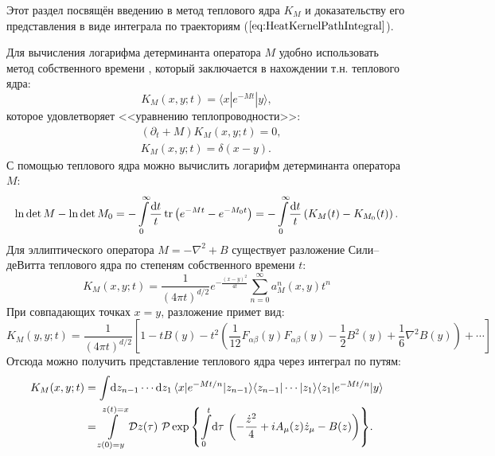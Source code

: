 
Этот раздел посвящён введению в метод теплового ядра $K_M$ и доказательству его представления в виде интеграла по траекториям ($\ref{eq:HeatKernelPathIntegral}$).

Для вычисления логарифма детерминанта оператора $M$ удобно использовать метод собственного времени \cite{Fock}, который заключается в нахождении т.н. теплового ядра:
\begin{equation*}
	K_M(x,y;t)=\langle x|e^{-Mt}|y\rangle,
\end{equation*}
которое удовлетворяет <<уравнению теплопроводности>>:
\begin{equation*}
	\begin{split}
		&(\partial_t + M)K_M(x,y;t)=0,\\
		&K_M(x,y;t)=\delta(x-y).
	\end{split}
\end{equation*}
С помощью теплового ядра можно вычислить логарифм детерминанта оператора $M$:
\begin{equation}
	\label{eq:LogDetHeatKernel}
	\ln{\det{M}} - \ln{\det{M_0}} = - \int\limits_0^\infty \!\frac{\mathrm{d} t}{t}\,\mathrm{tr}\left( e^{-Mt} - e^{-M_0 t} \right) = -\int\limits_0^\infty\!\frac{\mathrm{d} t}{t}\left( K_M(t) - K_{M_0}(t) \right).
\end{equation}
Для эллиптического оператора $M=-\nabla^2+B$ существует разложение Сили--деВитта теплового ядра по степеням собственного времени $t$:
\begin{equation}
	\label{eq:SilleyWitt}
	K_M(x,y;t)=\frac{1}{(4\pi t)^{d/2}}e^{-\frac{(x-y)^2}{4t}}\sum\limits_{n=0}^\infty a_M^n(x,y)t^n
\end{equation}
При совпадающих точках $x=y$, разложение примет вид:
\begin{equation*}
	K_M(y,y;t)=\frac{1}{(4\pi t)^{d/2}} \left[ 1 - t B(y) -t^2\left(\frac{1}{12}F_{\alpha \beta}(y)F_{\alpha \beta}(y) - \frac 12 B^2(y) + \frac 16 \nabla^2 B(y)\right) +\cdots\right]
\end{equation*}
Отсюда можно получить представление теплового ядра через интеграл по путям:
\begin{align}
	\label{eq:HeatKernelPathIntegral}
	K_M(x,y;t)&=\int\!\mathrm{d} z_{n-1}\cdots \mathrm{d} z_1\,\langle x|e^{-Mt/n}|z_{n-1}\rangle\langle z_{n-1}|\cdots|z_{1}\rangle\langle z_1|e^{-Mt/n}|y\rangle\nonumber\\
	&=\int\limits_{z(0)=y}^{z(t)=x}\mathcal{D}z(\tau)\,\,\mathcal{P}\exp{\left\{\int\limits_0^t\!\mathrm{d}\tau\,\left( -\frac{\dot{z}^2}{4} + i A_\mu(z)\dot{z}_\mu - B(z) \right)\right\}}.
\end{align}
